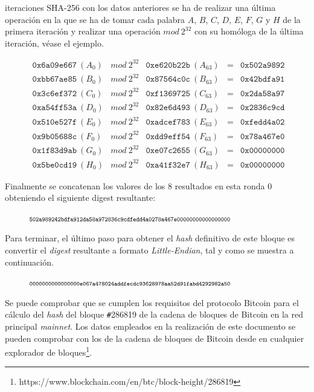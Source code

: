\documentclass{article}
\begin{document}
        \vspace{1.3mm}
        
         iteraciones SHA-256 con los datos anteriores se ha de realizar una última operación en la que se ha de tomar cada palabra $A$, $B$, $C$, $D$, $E$, $F$, $G$ y $H$ de la primera iteración y realizar  una operación $mod\ 2^{32}$ con su homóloga de la última iteración, véase el ejemplo.
        
        \begin{figure}[H]
        \centering
            $\begin{array}{lllll}
                \texttt{0x6a09e667}\ (A_{0}) & mod\ 2^{32} & \texttt{0xe620b22b}\ (A_{63}) & = & \texttt{0x502a9892} \\
                \texttt{0xbb67ae85}\ (B_{0}) & mod\ 2^{32} & \texttt{0x87564c0c}\ (B_{63}) & = & \texttt{0x42bdfa91} \\
                \texttt{0x3c6ef372}\ (C_{0}) & mod\ 2^{32} & \texttt{0xf1369725}\ (C_{63}) & = & \texttt{0x2da58a97} \\
                \texttt{0xa54ff53a}\ (D_{0}) & mod\ 2^{32} & \texttt{0x82e6d493}\ (D_{63}) & = & \texttt{0x2836c9cd} \\
                \texttt{0x510e527f}\ (E_{0}) & mod\ 2^{32} & \texttt{0xadcef783}\ (E_{63}) & = & \texttt{0xfedd4a02} \\
                \texttt{0x9b05688c}\ (F_{0}) & mod\ 2^{32} & \texttt{0xdd9eff54}\ (F_{63}) & = & \texttt{0x78a467e0} \\
                \texttt{0x1f83d9ab}\ (G_{0}) & mod\ 2^{32} & \texttt{0xe07c2655}\ (G_{63}) & = & \texttt{0x00000000} \\
                \texttt{0x5be0cd19}\ (H_{0}) & mod\ 2^{32} & \texttt{0xa41f32e7}\ (H_{63}) & = & \texttt{0x00000000}
            \end{array}$
        \end{figure}
        
        Finalmente se concatenan los valores de los 8 resultados en esta ronda 0 obteniendo el siguiente digest resultante:
        
        \begin{figure}[H]
        \centering
            $\scriptsize{\texttt{502a989242bdfa912da58a972836c9cdfedd4a0278a467e00000000000000000}}$
        \end{figure}
        Para terminar, el último paso para obtener el \textit{hash} definitivo de este bloque es convertir el \textit{digest} resultante a formato \textit{Little-Endian}, tal y como se muestra a continuación.
        \begin{figure}[H]
        \centering
            $\scriptsize{\texttt{0000000000000000e067a478024addfecdc93628978aa52d91fabd4292982a50}}$
        \end{figure}
        Se puede comprobar que se cumplen los requisitos del protocolo Bitcoin para el cálculo del \textit{hash} del bloque \texttt{\#}286819 de la cadena de bloques de Bitcoin en la red principal \textit{mainnet}. Los datos empleados en la realización de este documento se pueden comprobar con los de la cadena de bloques de Bitcoin desde en cualquier explorador de bloques\footnote{https://www.blockchain.com/en/btc/block-height/286819}.
\end{document}
